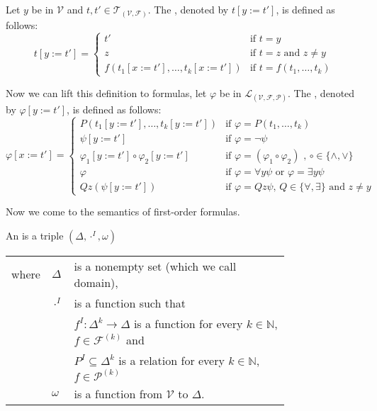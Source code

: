 \begin{definition}
	Let $y$ be in $\mathcal{V}$ and $t,t'\in\mathcal{T}_{(\mathcal{V},\mathcal{F})}$. The , denoted by $t\left[y:=t'\right]$, is defined as follows:
	\[t\left[y:=t'\right]=
		\begin{cases}
			t'                                                   & \text{if $t=y$}                \\ 
			z                                                    & \text{if $t=z$ and $z\neq y$}  \\%
			f(t_1\left[x:=t'\right],\dots,t_k\left[x:=t'\right]) & \text{if $t=f(t_1,\dots,t_k)$} 
		\end{cases}\]
	
	Now we can lift this definition to formulas, let $\varphi$ be in $\mathcal{L}_{(\mathcal{V},\mathcal{F},\mathcal{P})}$. The , denoted by $\varphi\left[y:=t'\right]$, is defined as follows:
	\[\varphi\left[x:=t'\right]=
		\begin{cases}
			P(t_1\left[y:=t'\right],\dots,t_k\left[y:=t'\right])        & \text{if $\varphi=P(t_1,\dots,t_k)$}                                     \\
			\psi\left[y:=t'\right]                                      & \text{if $\varphi=\neg\psi$}                                             \\
			\varphi_1\left[y:=t'\right]\circ\varphi_2\left[y:=t'\right] & \text{if $\varphi=(\varphi_1\circ\varphi_2)$ , $\circ\in\{\wedge,\vee\}$} \\
			\varphi                                                     & \text{if $\varphi=\forall y\psi$ or $\varphi=\exists y\psi$}                   \\
			Q z(\psi\left[y:=t'\right])                                 & \text{if $\varphi=Q z\psi$, $Q\in\{\forall,\exists\}$ and $z\neq y$}     
		\end{cases}\]

\end{definition}
Now we come to the semantics of first-order formulas.
\begin{definition}
	An  is a triple $(\Delta,\cdot^I,\omega)$
	\begin{tabular}{llp{0.78\linewidth}}
		where & $\Delta$  & is a nonempty set (which we call  domain),                                                     \\
& $\cdot^I$ & is a function such that                                                                        \\
&           & $f^I\colon\Delta^k\to\Delta$  is a function for every $k\in\mathbb{N}$, $f\in\mathcal{F}^{(k)}$ and \\
&           & $P^I\subseteq\Delta^k$ is a relation for every $k\in\mathbb{N}$, $f\in\mathcal{P}^{(k)}$       \\
& $\omega$  & is a function from $\mathcal{V}$ to $\Delta$.                                                  
	\end{tabular}
\end{definition}

